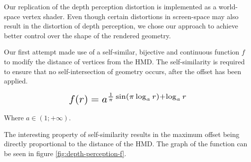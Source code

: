 Our replication of the depth perception distortion is implemented as a world-space vertex shader. Even though certain distortions in screen-space may also result in the distortion of depth perception, we chose our approach to achieve better control over the shape of the rendered geometry.

Our first attempt made use of a self-similar, bijective and continuous function $f$ to modify the distance of vertices from the \ac{HMD}. The self-similarity is required to ensure that no self-intersection of geometry occurs, after the offset has been applied.

\begin{equation}
    \scalebox{1.5}{
        $f(r) = a^{\frac{1}{\pi}\sin(\pi \log_a{r}) + \log_a{r}}$
    }
    \label{eq:depth-perception-f}
\end{equation}

Where $a \in (1; +\infty)$.

The interesting property of self-similarity results in the maximum offset being directly proportional to the distance of the \ac{HMD}. The graph of the function can be seen in figure \ref{fig:depth-perception-f}.

